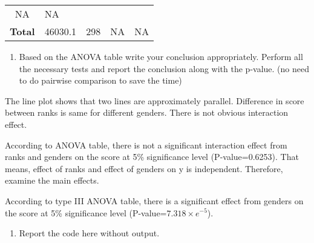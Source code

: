 \documentclass[]{article}
\providecommand{\tightlist}{%
  \setlength{\itemsep}{0pt}\setlength{\parskip}{0pt}}
\begin{document}
\begin{longtable}[]{@{}clllc@{}}
\begin{minipage}[t]{0.12\columnwidth}
NA\strut
\end{minipage} & \begin{minipage}[t]{0.14\columnwidth}\centering
NA\strut
\end{minipage}\tabularnewline
\begin{minipage}[t]{0.21\columnwidth}\centering
\textbf{Total}\strut
\end{minipage} & \begin{minipage}[t]{0.11\columnwidth}\raggedright
46030.1\strut
\end{minipage} & \begin{minipage}[t]{0.07\columnwidth}\raggedright
298\strut
\end{minipage} & \begin{minipage}[t]{0.12\columnwidth}\raggedright
NA\strut
\end{minipage} & \begin{minipage}[t]{0.14\columnwidth}\centering
NA\strut
\end{minipage}\tabularnewline
\bottomrule
\end{longtable}

\begin{enumerate}
\def\labelenumi{(\alph{enumi})}
\setcounter{enumi}{3}
\tightlist
\item
  \textcolor[rgb]{0.5,0.5,0.5}{Based on the ANOVA table write your conclusion appropriately. Perform all the necessary tests and report the conclusion along with the p-value. (no need to do pairwise comparison to save the time)}
\end{enumerate}

The line plot shows that two lines are approximately parallel.
Difference in score between ranks is same for different genders. There
is not obvious interaction effect.

According to ANOVA table, there is not a significant interaction effect
from ranks and genders on the score at 5\% significance level
(P-value=0.6253). That means, effect of ranks and effect of genders on y
is independent. Therefore, examine the main effects.

According to type III ANOVA table, there is a significant effect from
genders on the score at 5\% significance level
(P-value=\(7.318\times e^{-5}\)).

\begin{enumerate}
\def\labelenumi{(\alph{enumi})}
\setcounter{enumi}{4}
\tightlist
\item
  \textcolor[rgb]{0.5,0.5,0.5}{Report the code here without output.}
\end{enumerate}
\end{document}
